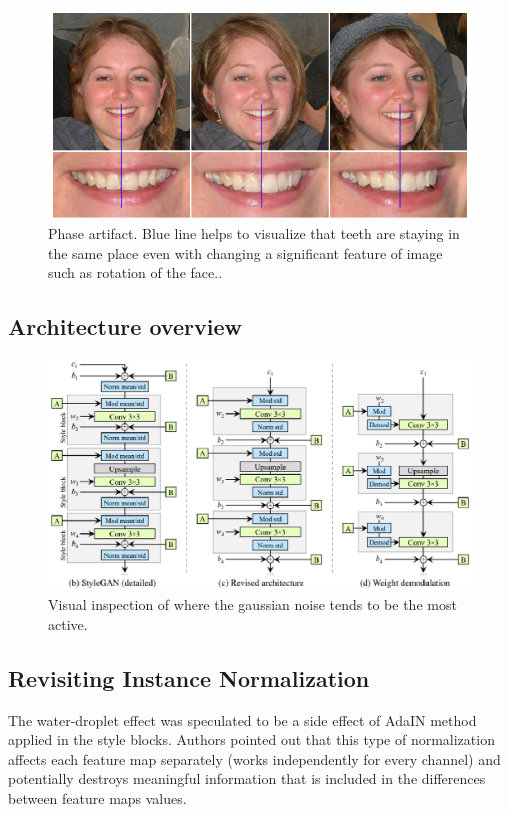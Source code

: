 \documentclass[12pt,a4paper,openany]{book}
\begin{document}
\begin{figure}[ht!]
    \centering
    \includegraphics[scale=1.2]{figs/phase.eps}
    \caption{Phase artifact. Blue line helps to visualize that teeth are staying in the same place even with changing a significant feature of image such as rotation of the face..}\label{Fig:STYLEGAN}
\end{figure}

\subsection{Architecture overview}

\begin{figure}[ht!]
    \centering
    \includegraphics[scale=1.0]{figs/stylegan2-scheme2.eps}
    \caption{Visual inspection of where the gaussian noise tends to be the most active.}\label{Fig:STYLEGAN}
\end{figure}


\subsection{Revisiting Instance Normalization}

The water-droplet effect was speculated to be a side effect of AdaIN method applied in the style blocks. Authors pointed out that this type of normalization affects each feature map separately (works independently for every channel) and potentially destroys meaningful information that is included in the differences between feature maps values.
\end{document}
